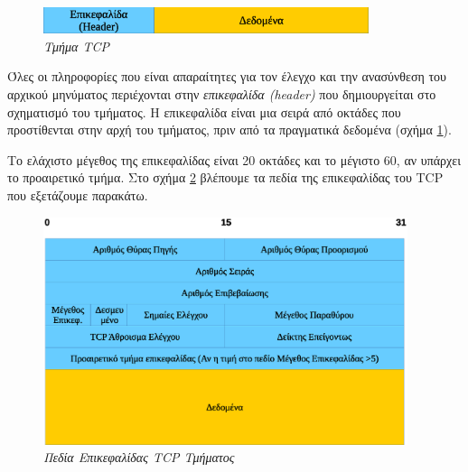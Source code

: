 \begin{figure}[!ht]
 \centering
 \includegraphics[width=0.85\textwidth]{images/chapter4/4-2}
 \caption {\textsl{Τμήμα TCP}}
 \label{4-2}
\end{figure}

Όλες οι πληροφορίες που είναι απαραίτητες για τον έλεγχο και την ανασύνθεση του αρχικού μηνύματος περιέχονται στην \emph{επικεφαλίδα (header)} που δημιουργείται στο σχηματισμό του τμήματος. Η επικεφαλίδα είναι μια σειρά από οκτάδες που προστίθενται στην αρχή του τμήματος, πριν από τα πραγματικά δεδομένα (σχήμα \ref{4-2}).

Το ελάχιστο μέγεθος της επικεφαλίδας είναι 20 οκτάδες και το μέγιστο 60, αν υπάρχει το προαιρετικό τμήμα. Στο σχήμα \ref{4-3} βλέπουμε τα πεδία της επικεφαλίδας του TCP που εξετάζουμε παρακάτω.

\begin{figure}[!ht]
 \centering
 \includegraphics[width=0.95\textwidth]{images/chapter4/4-3}
 \caption {\textsl{Πεδία Επικεφαλίδας TCP Τμήματος}}
 \label{4-3}
\end{figure}

